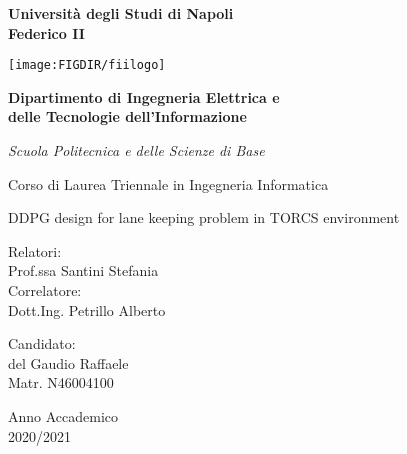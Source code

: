 %
%
\pagestyle{empty}
\begin{center}

%

{\bfseries\Huge Università degli Studi di Napoli\\}
\vspace{2.54mm}
{\bfseries\Huge Federico II\\}
\vspace{5mm}

\centerline{\mbox{\texttt{[image: \\FIGDIR/fiilogo]}}}

\medskip
{\bfseries\LARGE Dipartimento di Ingegneria Elettrica e\\}
\vspace{2.54mm}
{\bfseries\LARGE delle Tecnologie dell'Informazione\\}
\vspace{2.54mm}

{\emph{\large Scuola Politecnica e delle Scienze di Base\\}}
\vspace{2.54mm}

{\large Corso di Laurea Triennale in Ingegneria Informatica\\}
\vspace{5mm}


%
%

\vfill
{\LARGE DDPG design for lane keeping problem in TORCS environment
\\}		%
\vspace{4mm}

\vfill

\begin{multicols}{2}
	{\large Relatori:\\}
	Prof.ssa Santini Stefania\\
	
	{\large Correlatore:\\}
	Dott.Ing. Petrillo Alberto\\
	\vspace{5mm}
	
	{\large Candidato:\\}
	del Gaudio Raffaele\\
	Matr. N46004100\\
	\vspace{10mm}
\end{multicols}

\vfill

{\large Anno Accademico\\ 2020/2021}

\end{center}


